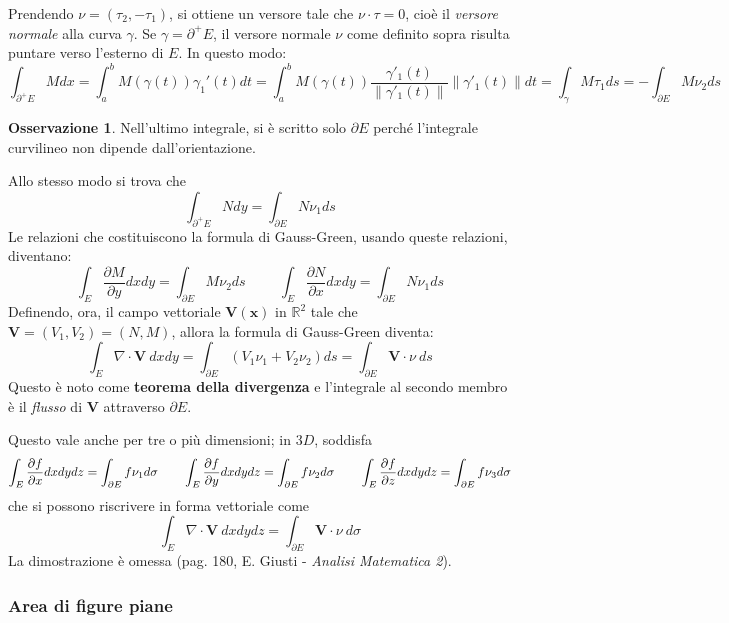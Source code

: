 \documentclass[10pt, a4paper]{scrartcl}
\theoremstyle{definition}
\numberwithin{esempio}{section}
\theoremstyle{definition}
\newtheorem{obs}{Osservazione}
\numberwithin{obs}{section}
\numberwithin{nota}{section}
\numberwithin{equation}{subsection}
\begin{document}
Prendendo $\nu = (\tau _2, -\tau _1)$, si ottiene un versore tale che $\nu \cdot \tau =0 $, cio\`e il \textit{versore normale} alla curva $\gamma$.
Se $\gamma = \partial ^+ E$, il versore normale $\nu $ come definito sopra risulta puntare verso l'esterno di $E$.
In questo modo:
\[
\int_{\partial ^+E} M dx = \int_{a} ^b M(\gamma(t)) \gamma_1'(t) dt = \int_{a} ^b M(\gamma(t)) \frac{\gamma'_1(t)}{\left\lVert \gamma'_1(t) \right\rVert }\left\lVert \gamma'_1(t) \right\rVert  dt  = \int_{\gamma} M\tau _1  ds = - \int_{\partial E} M\nu _2 ds
\] 
\begin{obs}
	Nell'ultimo integrale, si \`e scritto solo $\partial E$ perch\'e l'integrale curvilineo non dipende dall'orientazione.
\end{obs}
Allo stesso modo si trova che
\[
\int_{\partial ^+ E} N dy = \int_{\partial E} N \nu_1 ds
\] 
Le relazioni che costituiscono la formula di Gauss-Green, usando queste relazioni, diventano:
\[
\int_{E} \frac{\partial M}{\partial y} dxdy = \int_{\partial E} M\nu _2  ds \hspace{1cm}\int_{E} \frac{\partial N}{\partial x} dxdy = \int_{\partial E} N \nu _1 ds
\] 
Definendo, ora, il campo vettoriale $\mathbf{V} (\mathbf{x} )$ in $\mathbb{R}^2$ tale che $\mathbf{V} = (V_1,V_2) = (N,M)$, allora la formula di Gauss-Green diventa:
\begin{equation}
	\int_{E} \nabla \cdot \mathbf{V} \ dxdy = \int_{\partial E} (V_1 \nu _1 + V_2 \nu _2) ds = \int_{\partial E} \mathbf{V} \cdot \nu \ ds
\end{equation}
Questo \`e noto come \textbf{teorema della divergenza} e l'integrale al secondo membro \`e il \textit{flusso} di $\mathbf{V} $ attraverso $\partial E$.

Questo vale anche per tre o pi\`u dimensioni; in $3D$, soddisfa
\[
\int_{E} \frac{\partial f}{\partial x} dxdydz = \int_{\partial E} f\nu _1 d\sigma \hspace{.7cm} \int_{E} \frac{\partial f}{\partial y} dxdydz = \int_{\partial E} f\nu _2 d\sigma \hspace{.7cm}\int_{E} \frac{\partial f}{\partial z} dxdydz = \int_{\partial E} f\nu _3 d\sigma
\] 
che si possono riscrivere in forma vettoriale come
\begin{equation}
	\int_{E} \nabla \cdot \mathbf{V} \ dxdydz = \int_{\partial E} \mathbf{V} \cdot \nu \ d\sigma 
\end{equation}
La dimostrazione \`e omessa (pag. 180, E. Giusti - \textit{Analisi Matematica 2}).

\subsubsection{Area di figure piane}
\end{document}

